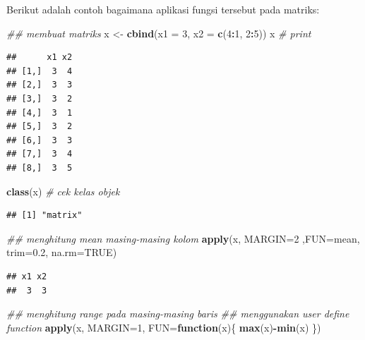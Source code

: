\documentclass[]{book}
\newenvironment{Shaded}{\begin{snugshade}}{\end{snugshade}}
\newcommand{\CommentTok}[1]{\textcolor[rgb]{0.56,0.35,0.01}{\textit{#1}}}
\newcommand{\ControlFlowTok}[1]{\textcolor[rgb]{0.13,0.29,0.53}{\textbf{#1}}}
\newcommand{\DataTypeTok}[1]{\textcolor[rgb]{0.13,0.29,0.53}{#1}}
\newcommand{\DecValTok}[1]{\textcolor[rgb]{0.00,0.00,0.81}{#1}}
\newcommand{\FloatTok}[1]{\textcolor[rgb]{0.00,0.00,0.81}{#1}}
\newcommand{\KeywordTok}[1]{\textcolor[rgb]{0.13,0.29,0.53}{\textbf{#1}}}
\newcommand{\NormalTok}[1]{#1}
\newcommand{\OperatorTok}[1]{\textcolor[rgb]{0.81,0.36,0.00}{\textbf{#1}}}
\newcommand{\OtherTok}[1]{\textcolor[rgb]{0.56,0.35,0.01}{#1}}
\newcommand{\StringTok}[1]{\textcolor[rgb]{0.31,0.60,0.02}{#1}}
\theoremstyle{definition}
\theoremstyle{definition}
\theoremstyle{definition}
\theoremstyle{remark}
\begin{document}
Berikut adalah contoh bagaimana aplikasi fungsi tersebut pada matriks:

\begin{Shaded}
\begin{Highlighting}[]
\CommentTok{## membuat matriks}
\NormalTok{x <-}\StringTok{ }\KeywordTok{cbind}\NormalTok{(}\DataTypeTok{x1 =} \DecValTok{3}\NormalTok{, }\DataTypeTok{x2 =} \KeywordTok{c}\NormalTok{(}\DecValTok{4}\OperatorTok{:}\DecValTok{1}\NormalTok{, }\DecValTok{2}\OperatorTok{:}\DecValTok{5}\NormalTok{))}
\NormalTok{x }\CommentTok{# print}
\end{Highlighting}
\end{Shaded}

\begin{verbatim}
##      x1 x2
## [1,]  3  4
## [2,]  3  3
## [3,]  3  2
## [4,]  3  1
## [5,]  3  2
## [6,]  3  3
## [7,]  3  4
## [8,]  3  5
\end{verbatim}

\begin{Shaded}
\begin{Highlighting}[]
\KeywordTok{class}\NormalTok{(x) }\CommentTok{# cek kelas objek}
\end{Highlighting}
\end{Shaded}

\begin{verbatim}
## [1] "matrix"
\end{verbatim}

\begin{Shaded}
\begin{Highlighting}[]
\CommentTok{## menghitung mean masing-masing kolom}
\KeywordTok{apply}\NormalTok{(x, }\DataTypeTok{MARGIN=}\DecValTok{2}\NormalTok{ ,}\DataTypeTok{FUN=}\NormalTok{mean, }\DataTypeTok{trim=}\FloatTok{0.2}\NormalTok{, }\DataTypeTok{na.rm=}\OtherTok{TRUE}\NormalTok{)}
\end{Highlighting}
\end{Shaded}

\begin{verbatim}
## x1 x2 
##  3  3
\end{verbatim}

\begin{Shaded}
\begin{Highlighting}[]
\CommentTok{## menghitung range pada masing-masing baris}
\CommentTok{## menggunakan user define function}
\KeywordTok{apply}\NormalTok{(x, }\DataTypeTok{MARGIN=}\DecValTok{1}\NormalTok{,}
      \DataTypeTok{FUN=}\ControlFlowTok{function}\NormalTok{(x)\{}
        \KeywordTok{max}\NormalTok{(x)}\OperatorTok{-}\KeywordTok{min}\NormalTok{(x)}
\NormalTok{      \})}
\end{Highlighting}
\end{Shaded}
\end{document}
